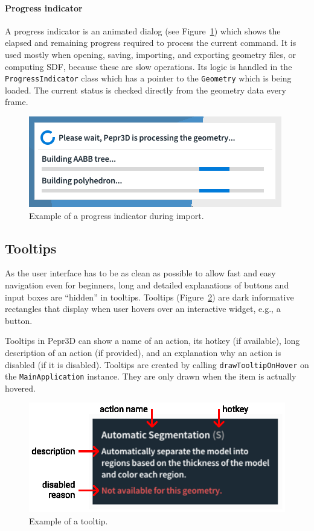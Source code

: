 \paragraph{Progress indicator}
A progress indicator is an animated dialog (see Figure~\ref{fig:progressindicator}) which shows the elapsed and remaining progress required to process the current command.
It is used mostly when opening, saving, importing, and exporting geometry files, or computing SDF, because these are slow operations.
Its logic is handled in the \texttt{ProgressIndicator} class which has a pointer to the \texttt{Geometry} which is being loaded.
The current status is checked directly from the geometry data every frame.

\begin{figure}[h]
	\centering
	\centerline{\includegraphics[scale=1.0]{images/progress_indicator.png}}
	\caption{Example of a progress indicator during import.}
	\label{fig:progressindicator}
\end{figure}

\subsection{Tooltips}

As the user interface has to be as clean as possible to allow fast and easy navigation even for beginners, long and detailed explanations of buttons and input boxes are ``hidden'' in tooltips.
Tooltips (Figure~\ref{fig:tooltip}) are dark informative rectangles that display when user hovers over an interactive widget, e.g., a button.

Tooltips in Pepr3D can show a name of an action, its hotkey (if available), long description of an action (if provided), and an explanation why an action is disabled (if it is disabled).
Tooltips are created by calling \texttt{drawTooltipOnHover} on the \texttt{MainApplication} instance.
They are only drawn when the item is actually hovered.

\begin{figure}[h]
	\centering
	\centerline{\includegraphics[scale=1.0]{images/tooltip.eps}}
	\caption{Example of a tooltip.}
	\label{fig:tooltip}
\end{figure}

